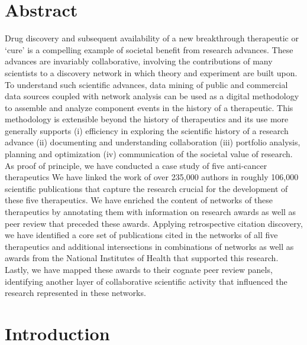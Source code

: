 \documentclass[10pt,letterpaper]{article}
\begin{document}
\section*{Abstract}

Drug discovery and subsequent availability of a new breakthrough therapeutic or `cure' is a compelling example of societal benefit from research advances. These advances are invariably collaborative, involving the contributions of many scientists to a discovery network in which theory and experiment are built upon. To understand such scientific advances, data mining of public and commercial data sources coupled with network analysis can be used as a digital methodology to assemble and analyze component events in the history of a therapeutic. This methodology is extensible beyond the history of therapeutics and its use more generally supports (i) efficiency in  exploring  the scientific history of a research advance (ii) documenting and understanding collaboration (iii) portfolio analysis, planning and optimization (iv) communication of the societal value of research.  As proof of principle, we have conducted a case study of five anti-cancer therapeutics  We have linked the work of over 235,000 authors in roughly 106,000 scientific publications that capture the research crucial for the development of these five therapeutics. We have enriched the content of networks of these therapeutics by annotating them with information on research awards as well as peer review that preceded these awards. Applying retrospective citation discovery, we have identified a core set of publications cited in the networks of all five therapeutics and additional intersections in combinations of networks as well as awards from the National Institutes of Health that supported this research. Lastly, we have mapped these awards to their cognate peer review panels, identifying another layer of collaborative scientific activity that influenced the research represented in these networks. 

\linenumbers

\section*{Introduction}
\end{document}
